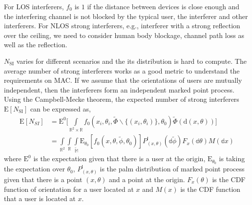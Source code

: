 \documentclass[10pt, conference, letterpaper]{IEEEtran}
\begin{document}
For LOS interferers, $f_0$ is $1$ if the distance between devices is close enough and the interfering channel is not blocked by the typical user, the interferer and other interferers. For NLOS strong interferers, e.g., interferer with a strong reflection over the ceiling, we need to consider human body blockage, channel path loss as well as the reflection. 

$N_{\mathrm{SI}}$ varies for different scenarios and the its distribution is hard to compute. The average number of strong interferers works as a good metric to understand the requirements on MAC. If we assume that the orientations of users are mutually independent, then the interferers form an independent marked point process. Using the Campbell-Mecke theorem, the expected number of strong interferers $\mathrm{E}[N_{\mathrm{SI}}]$ can be expressed as, 
\begin{equation} \label{eq:N_SI}
\begin{split}
\mathrm{E}[N_{SI}] &= \mathrm{E}^0\bigg[\int\limits_{\mathbb{R}^2\times\mathbb{R}}f_0(x_i, \theta_i, \tilde{\Phi}\backslash\{(x_i,\theta_i)\}, \theta_0)\tilde{\Phi}(\mathrm{d}(x,\theta)) \bigg]\\
&= \int\limits_{\mathbb{R}^2}\int\limits_{\mathbb{R}}\int\limits_{\mathbb{\tilde{M}}}\mathrm{E}_{\theta_0}[f_0(x,\theta,\tilde{\phi}, \theta_0)]P_{(x,\theta)}^{!}(\mathbb{d}\tilde{\phi})F_x(\mathbb{d}\theta)M(\mathbb{d}x)
\end{split}
\end{equation}
where $\mathrm{E}^0$ is the expectation given that there is a user at the origin, $\mathrm{E}_{\theta_0}$ is taking the expectation over $\theta_0$, $P_{(x,\theta)}^!$ is the palm distribution of marked point process given that there is a point $(x, \theta)$ and a point at the origin. $F_x(\theta)$ is the CDF function of orientation for a user located at $x$ and $M(x)$ is the CDF function that a user is located at $x$. 
\end{document}
